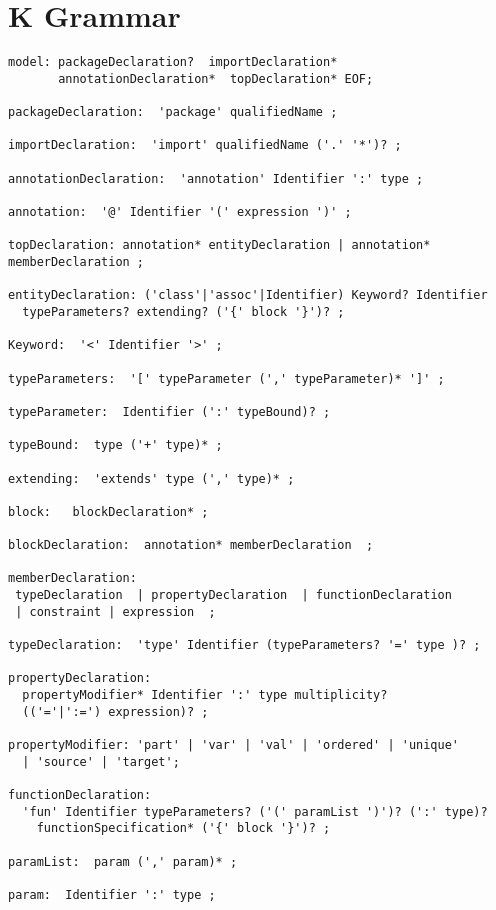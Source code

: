 \newpage
\section{K Grammar}
\label{app:grammar}

{\scriptsize 

\begin{verbatim}
model: packageDeclaration?  importDeclaration*  
       annotationDeclaration*  topDeclaration* EOF;

packageDeclaration:  'package' qualifiedName ;

importDeclaration:  'import' qualifiedName ('.' '*')? ;

annotationDeclaration:  'annotation' Identifier ':' type ;

annotation:  '@' Identifier '(' expression ')' ;

topDeclaration: annotation* entityDeclaration | annotation* memberDeclaration ;

entityDeclaration: ('class'|'assoc'|Identifier) Keyword? Identifier 
  typeParameters? extending? ('{' block '}')? ;

Keyword:  '<' Identifier '>' ;

typeParameters:  '[' typeParameter (',' typeParameter)* ']' ;

typeParameter:  Identifier (':' typeBound)? ;

typeBound:  type ('+' type)* ;
      
extending:  'extends' type (',' type)* ;

block:   blockDeclaration* ;

blockDeclaration:  annotation* memberDeclaration  ;

memberDeclaration:
 typeDeclaration  | propertyDeclaration  | functionDeclaration
 | constraint | expression  ;

typeDeclaration:  'type' Identifier (typeParameters? '=' type )? ;

propertyDeclaration:
  propertyModifier* Identifier ':' type multiplicity? 
  (('='|':=') expression)? ;

propertyModifier: 'part' | 'var' | 'val' | 'ordered' | 'unique' 
  | 'source' | 'target';

functionDeclaration:
  'fun' Identifier typeParameters? ('(' paramList ')')? (':' type)?
    functionSpecification* ('{' block '}')? ;

paramList:  param (',' param)* ;

param:  Identifier ':' type ;


\end{verbatim}}
